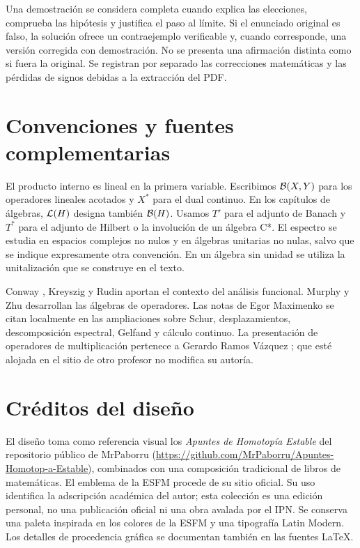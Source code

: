 Una demostración se considera completa cuando explica las elecciones, comprueba las hipótesis y justifica el paso al límite. Si el enunciado original es falso, la solución ofrece un contraejemplo verificable y, cuando corresponde, una versión corregida con demostración. No se presenta una afirmación distinta como si fuera la original. Se registran por separado las correcciones matemáticas y las pérdidas de signos debidas a la extracción del PDF.

\section*{Convenciones y fuentes complementarias}
El producto interno es lineal en la primera variable. Escribimos $\mathcal B(X,Y)$ para los operadores lineales acotados y $X^*$ para el dual continuo. En los capítulos de álgebras, $\mathcal L(H)$ designa también $\mathcal B(H)$. Usamos $T'$ para el adjunto de Banach y $T^*$ para el adjunto de Hilbert o la involución de un álgebra C*. El espectro se estudia en espacios complejos no nulos y en álgebras unitarias no nulas, salvo que se indique expresamente otra convención. En un álgebra sin unidad se utiliza la unitalización que se construye en el texto.

Conway \cite{conway1990}, Kreyszig \cite{kreyszig1978} y Rudin \cite{rudin1991} aportan el contexto del análisis funcional. Murphy \cite{murphy1990} y Zhu \cite{zhu1993} desarrollan las álgebras de operadores. Las notas de Egor Maximenko se citan localmente en las ampliaciones sobre Schur, desplazamientos, descomposición espectral, Gelfand y cálculo continuo. La presentación de operadores de multiplicación pertenece a Gerardo Ramos Vázquez \cite{ramos2018}; que esté alojada en el sitio de otro profesor no modifica su autoría.

\section*{Créditos del diseño}
El diseño toma como referencia visual los \emph{Apuntes de Homotopía Estable} del repositorio público de MrPaborru (\url{https://github.com/MrPaborru/Apuntes-Homotop-a-Estable}), combinados con una composición tradicional de libros de matemáticas. El emblema de la ESFM procede de su sitio oficial. Su uso identifica la adscripción académica del autor; esta colección es una edición personal, no una publicación oficial ni una obra avalada por el IPN. Se conserva una paleta inspirada en los colores de la ESFM y una tipografía Latin Modern. Los detalles de procedencia gráfica se documentan también en las fuentes LaTeX.
